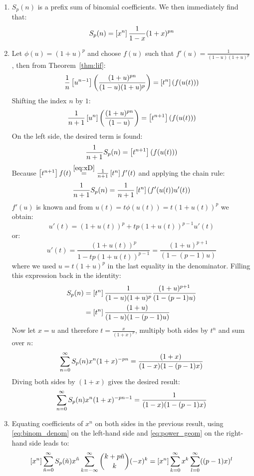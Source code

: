 \begin{solution}
    \begin{enumerate}[label=(\alph*)]
        \item $S_p(n)$ is a prefix sum of binomial coefficients. We then immediately find that:
        \[
            S_p(n) = \left[x^n\right] \frac{1}{1-x} (1+x)^{pn}
        \]
        \item \hypertarget{eq:ch5:5:b}{} Let $\phi(u) = (1+u)^p$ and choose $f(u)$ such that $f'(u) = \frac{1}{(1-u)(1+u)^p}$, then from Theorem~\ref{thm:lif}:
        \[
            \frac{1}{n}\left[u^{n-1}\right] \left(\frac{(1+u)^{pn}}{(1-u)(1+u)^p}\right) = \left[t^n\right] (f(u(t)))
        \]
        Shifting the index $n$ by $1$:
        \[
            \frac{1}{n+1}\left[u^{n}\right] \left(\frac{(1+u)^{pn}}{(1-u)}\right) = \left[t^{n+1}\right] (f(u(t)))
        \]
        On the left side, the desired term is found:
        \[
            \frac{1}{n+1} S_p(n) = \left[t^{n+1}\right] (f(u(t)))
        \]
        Because $\left[t^{n+1}\right] f(t) \overset{\eqref{eq:xD}}{=} \frac{1}{n+1}\left[t^n\right] f'(t)$ and applying the chain rule:
        \[
            \frac{1}{n+1} S_p(n) = \frac{1}{n+1}\left[t^{n}\right] (f'(u(t)) u'(t))
        \]
        $f'(u)$ is known and from $u(t) = t\phi(u(t)) = t(1+u(t))^p$ we obtain:
        \[
            u'(t) = (1+u(t))^p + tp(1+u(t))^{p-1}u'(t)
        \]
        or:
        \[
            u'(t) = \frac{(1+u(t))^p}{1-tp(1+u(t))^{p-1}} = \frac{(1+u)^{p+1}}{(1-(p-1)u)}
        \]
        where we used $u = t(1+u)^p$ in the last equality in the denominator. Filling this expression back in the identity:
        \begin{align*}
            S_p(n) &= \left[t^n\right] \frac{1}{(1-u)(1+u)^p} \frac{(1+u)^{p+1}}{(1-(p-1)u)} \\
            &= \left[t^n\right]\frac{(1+u)}{(1-u)(1-(p-1)u)}
        \end{align*}
        Now let $x=u$ and therefore $t = \frac{x}{(1+x)^p}$, multiply both sides by $t^n$ and sum over $n$:
        \[
            \sum_{n=0}^\infty S_p(n)x^n (1+x)^{-pn} = \frac{(1+x)}{(1-x)(1-(p-1)x)}
        \]
        Diving both sides by $(1+x)$ gives the desired result:
        \[
            \sum_{n=0}^\infty S_p(n) x^n (1+x)^{-pn-1} = \frac{1}{(1-x)(1-(p-1)x)}
        \]
        \item Equating coefficients of $x^n$ on both sides in the previous result, using \eqref{eq:binom_denom} on the left-hand side and \eqref{eq:power_geom} on the right-hand side leads to:
        \begin{align*}
            \coeff{x^{n}} \bsum[\tilde{n}] S_p(\tilde{n})x^{\tilde{n}} \infsum[k] \binom{k + p\tilde{n}}{k}(-x)^k &= \coeff{x^n} \bsum[k] x^k \bsum[l] ((p-1)x)^l \\

\end{align*}
\end{enumerate}
\end{solution}
